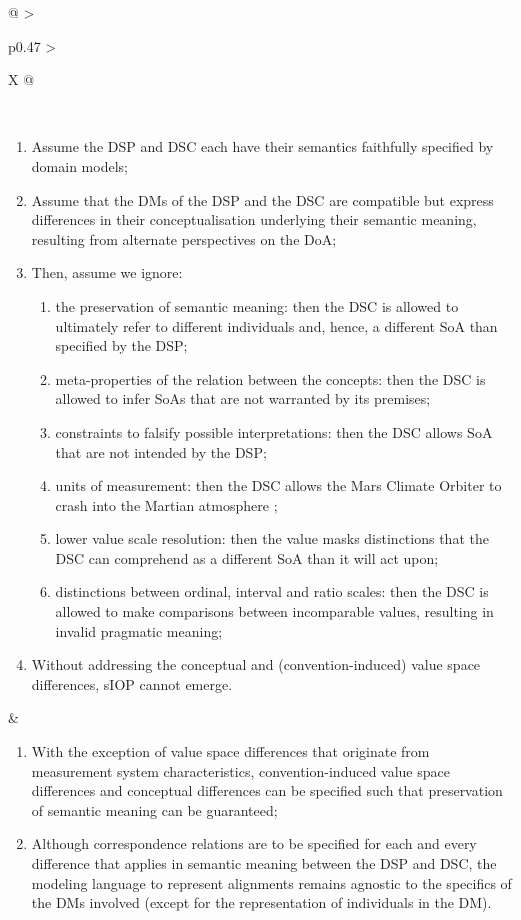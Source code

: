 \begin{xltabular}[l]{\linewidth}{@{} >{\small\raggedright\arraybackslash}p{0.47\linewidth} >{\small\raggedright\arraybackslash}X @{}}
\begin{description}[labelwidth=3.7cm,leftmargin=3.7cm+1ex,nosep,topsep=2ex,labelsep=1ex,font=\bfseries]
\end{description}\\
\begin{enumerate}[left=6pt, nosep]
  \item Assume the DSP and DSC each have their semantics faithfully specified by domain models;
  \item Assume that the DMs of the DSP and the DSC are compatible but express differences in their conceptualisation underlying their semantic meaning, resulting from alternate perspectives on the DoA;
  \item Then, assume we ignore:
  \begin{enumerate}
    \item the preservation of semantic meaning: then the DSC is allowed to ultimately refer to different individuals and, hence, a different SoA than specified by the DSP; 
    \item meta-properties of the relation between the concepts: then the DSC is allowed to infer SoAs that are not warranted by its premises;
    \item constraints to falsify possible interpretations: then the DSC allows SoA that are not intended by the DSP; 
    \item units of measurement: then the DSC allows the Mars Climate Orbiter to crash into the Martian atmosphere \cite{Leveson2004};
    \item lower value scale resolution: then the value masks distinctions that the DSC can comprehend as a different SoA than it will act upon;
    \item distinctions between ordinal, interval and ratio scales: then the DSC is allowed to make comparisons between incomparable values, resulting in invalid pragmatic meaning;
  \end{enumerate}
  \item Without addressing the conceptual and (convention-induced) value space differences, sIOP cannot emerge.
\end{enumerate}
&
\begin{enumerate}[left=10pt, nosep]
  \item With the exception of value space differences that originate from measurement system characteristics, convention-induced value space differences and conceptual differences can be specified such that preservation of semantic meaning can be guaranteed;
  \item Although correspondence relations are to be specified for each and every difference that applies in semantic meaning between the DSP and DSC, the modeling language to represent alignments remains agnostic to the specifics of the DMs involved (except for the representation of individuals in the DM).

\end{enumerate}
\end{xltabular}
